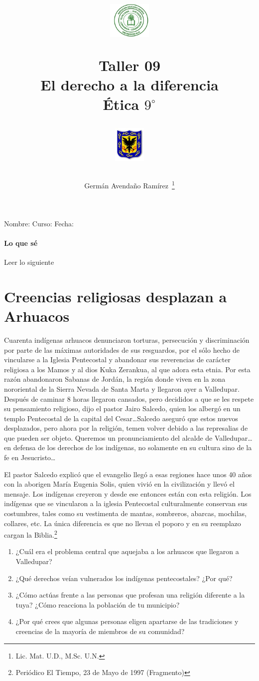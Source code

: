 \documentclass[10pt,twoside]{article}
\author{Germ\'an Avenda\~no Ram\'irez~\thanks{Lic. Mat. U.D., M.Sc. U.N.}}
\title{\begin{minipage}{.2\textwidth}
\includegraphics[height=1.75cm]{Images/logo-colegio.png}\end{minipage}
\begin{minipage}{.55\textwidth}
\begin{center}
Taller 09\\
El derecho a la diferencia\\
Ética $9^{\circ}$
\end{center}
\end{minipage}\hfill
\begin{minipage}{.2\textwidth}
\includegraphics[height=1.75cm]{Images/logo-sed.png} 
\end{minipage}}
\date{}
\begin{document}
\maketitle
Nombre: \hrulefill Curso: \underline{\hspace*{44pt}} Fecha: \underline{\hspace*{2.5cm}}
\paragraph*{Lo que s\'{e}}
Leer lo siguiente
\section*{Creencias religiosas desplazan a Arhuacos}
Cuarenta indígenas arhuacos denunciaron torturas, persecución y discriminación por parte de las máximas autoridades de sus resguardos, por el sólo hecho de vincularse a la Iglesia Pentecostal y abandonar sus reverencias de carácter religiosa a los Mamos y al dios Kuka Zerankua, al que adora esta etnia. Por esta razón abandonaron Sabanas de Jordán,
la región donde viven en la zona nororiental de la Sierra Nevada de Santa Marta y llegaron ayer a Valledupar. Después de caminar 8 horas llegaron cansados, pero decididos a que se les respete su pensamiento religioso, dijo el pastor Jairo Salcedo, quien los albergó en un templo Pentecostal de la capital del Cesar\ldots Salcedo aseguró que estos nuevos desplazados, pero ahora por la religión, temen volver debido a
las represalias de que pueden ser objeto. Queremos un pronunciamiento del alcalde de Valledupar\ldots en defensa de los derechos de los indígenas, no solamente en su cultura sino de la fe en Jesucristo\ldots

El pastor Salcedo explicó que el evangelio llegó a esas regiones hace unos 40 años con la aborigen María Eugenia Solis, quien vivió en la civilización y llevó el mensaje. Los indígenas creyeron y desde ese entonces están con esta religión. Los indígenas que se vincularon a la iglesia Pentecostal culturalmente conservan sus costumbres, tales como su vestimenta de mantas, sombreros, abarcas, mochilas, collares, etc. La única diferencia es que no llevan el poporo y en su reemplazo cargan la Biblia.\footnote{Periódico El Tiempo, 23 de Mayo de 1997 (Fragmento)}
\begin{enumerate}
\item ¿Cuál era el problema central que aquejaba a los arhuacos
que llegaron a Valledupar?
\item ¿Qué derechos veían vulnerados los indígenas pentecostales?
¿Por qué?
\item ¿Cómo actúas frente a las personas que profesan una religión
diferente a la tuya? ¿Cómo reacciona la población de tu municipio?
\item ¿Por qué crees que algunas personas eligen apartarse de las
tradiciones y creencias de la mayoría de miembros de su
comunidad?
\end{enumerate}
\end{document}
